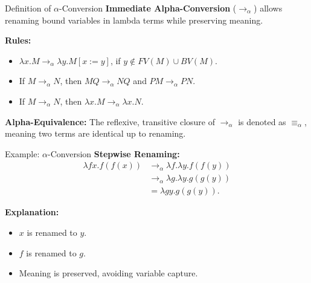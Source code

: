 \documentclass{beamer}
\begin{document}
\begin{frame}{Definition of $\alpha$-Conversion}
  \textbf{Immediate Alpha-Conversion} ($\rightarrow_{\alpha}$) allows renaming bound variables in lambda terms while preserving meaning.
  
  \vspace{0.5cm}
  \textbf{Rules:}
  \begin{itemize}
      \item $\lambda x. M \rightarrow_{\alpha} \lambda y. M[x := y]$, if $y \notin FV(M) \cup BV(M)$.
      \item If $M \rightarrow_{\alpha} N$, then $MQ \rightarrow_{\alpha} NQ$ and $PM \rightarrow_{\alpha} PN$.
      \item If $M \rightarrow_{\alpha} N$, then $\lambda x. M \rightarrow_{\alpha} \lambda x. N$.
  \end{itemize}
  
  \vspace{0.5cm}
  \textbf{Alpha-Equivalence:} The reflexive, transitive closure of $\rightarrow_{\alpha}$ is denoted as $\equiv_{\alpha}$, meaning two terms are identical up to renaming.
\end{frame}

\begin{frame}{Example: $\alpha$-Conversion}
  \textbf{Stepwise Renaming:}
  \begin{align*}
      \lambda fx. f(f(x)) &\rightarrow_{\alpha} \lambda f. \lambda y. f(f(y)) \\
      &\rightarrow_{\alpha} \lambda g. \lambda y. g(g(y)) \\
      &= \lambda gy. g(g(y)).
  \end{align*}
  
  \textbf{Explanation:}
  \begin{itemize}
      \item $x$ is renamed to $y$.
      \item $f$ is renamed to $g$.
      \item Meaning is preserved, avoiding variable capture.
  \end{itemize}
\end{frame}

  
\end{document}
